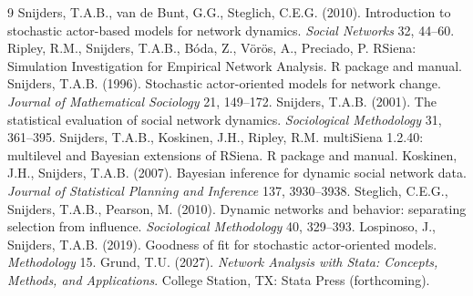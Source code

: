 \documentclass[11pt,a4paper]{report}
\begin{document}
\tableofcontents














\appendix





\begin{thebibliography}{9}
 Snijders, T.A.B., van de Bunt, G.G., Steglich, C.E.G. (2010). Introduction to stochastic actor-based models for network dynamics. \emph{Social Networks} 32, 44--60.
 Ripley, R.M., Snijders, T.A.B., B\'{o}da, Z., V\"{o}r\"{o}s, A., Preciado, P. RSiena: Simulation Investigation for Empirical Network Analysis. R package and manual.
 Snijders, T.A.B. (1996). Stochastic actor-oriented models for network change. \emph{Journal of Mathematical Sociology} 21, 149--172.
 Snijders, T.A.B. (2001). The statistical evaluation of social network dynamics. \emph{Sociological Methodology} 31, 361--395.
 Snijders, T.A.B., Koskinen, J.H., Ripley, R.M. multiSiena 1.2.40: multilevel and Bayesian extensions of RSiena. R package and manual.
 Koskinen, J.H., Snijders, T.A.B. (2007). Bayesian inference for dynamic social network data. \emph{Journal of Statistical Planning and Inference} 137, 3930--3938.
 Steglich, C.E.G., Snijders, T.A.B., Pearson, M. (2010). Dynamic networks and behavior: separating selection from influence. \emph{Sociological Methodology} 40, 329--393.
 Lospinoso, J., Snijders, T.A.B. (2019). Goodness of fit for stochastic actor-oriented models. \emph{Methodology} 15.
 Grund, T.U. (2027). \emph{Network Analysis with Stata: Concepts, Methods, and Applications}. College Station, TX: Stata Press (forthcoming).
\end{thebibliography}
\end{document}
